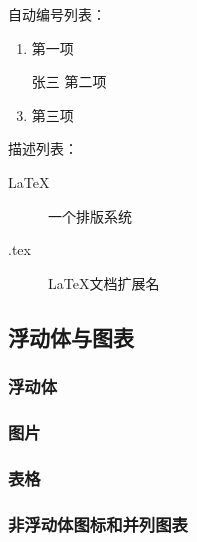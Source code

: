             自动编号列表：
            \begin{enumerate}
                \item 第一项
                \item [张三] 第二项 
                \item 第三项
            \end{enumerate}

            描述列表：
            \begin{description}
                \item[LaTeX] 一个排版系统
                \item[.tex] LaTeX文档扩展名  
            \end{description}

    \subsection{浮动体与图表}

        \subsubsection{浮动体}

        \subsubsection{图片}

        \subsubsection{表格}

        \subsubsection{非浮动体图标和并列图表}

